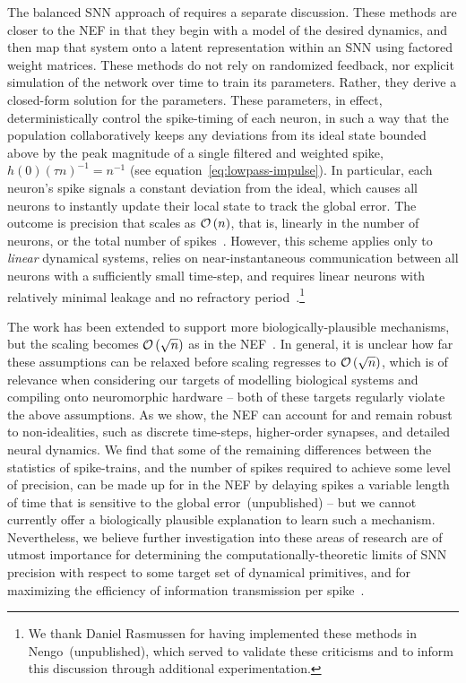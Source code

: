 The balanced SNN approach of \citet{boerlin2011spike, boerlin2013predictive} requires a separate discussion.
These methods are closer to the NEF in that they begin with a model of the desired dynamics, and then map that system onto a latent representation within an SNN using factored weight matrices.
These methods do not rely on randomized feedback, nor explicit simulation of the network over time to train its parameters.
Rather, they derive a closed-form solution for the parameters.
These parameters, in effect, deterministically control the spike-timing of each neuron, in such a way that the population collaboratively keeps any deviations from its ideal state bounded above by the peak magnitude of a single filtered and weighted spike, $h(0) \left( \tau n \right)^{-1} = n^{-1}$ (see equation~\ref{eq:lowpass-impulse}).
In particular, each neuron's spike signals a constant deviation from the ideal, which causes all neurons to instantly update their local state to track the global error.
The outcome is precision that scales as $\mathcal{O}\left({n}\right)$, that is, linearly in the number of neurons, or the total number of spikes~\citep{boahen2017neuromorph}. 
However, this scheme applies only to \emph{linear} dynamical systems, relies on near-instantaneous communication between all neurons with a sufficiently small time-step, and requires linear neurons with relatively minimal leakage and no refractory period~\citep{boerlin2013predictive}.\footnote{
We thank Daniel Rasmussen for having implemented these methods in Nengo~(unpublished),
which served to validate these criticisms and to inform this discussion through additional experimentation.}

The work has been extended to support more biologically-plausible mechanisms, but the scaling becomes $\mathcal{O}\left({\sqrt{n}}\right)$ as in the NEF~\citep[][Figure~12d]{schwemmer2015constructing}.
In general, it is unclear how far these assumptions can be relaxed before scaling regresses to $\mathcal{O}\left({\sqrt{n}}\right)$, which is of relevance when considering our targets of modelling biological systems and compiling onto neuromorphic hardware -- both of these targets regularly violate the above assumptions.
As we show, the NEF can account for and remain robust to non-idealities, such as discrete time-steps, higher-order synapses, and detailed neural dynamics.
We find that some of the remaining differences between the statistics of spike-trains, and the number of spikes required to achieve some level of precision, can be made up for in the NEF by delaying spikes a variable length of time that is sensitive to the global error~(unpublished) -- but we cannot currently offer a biologically plausible explanation to learn such a mechanism.
Nevertheless, we believe further investigation into these areas of research are of utmost importance for determining the computationally-theoretic limits of SNN precision with respect to some target set of dynamical primitives, and for maximizing the efficiency of information transmission per spike~\citep[][pp.~92--127]{eliasmith2003a}.

